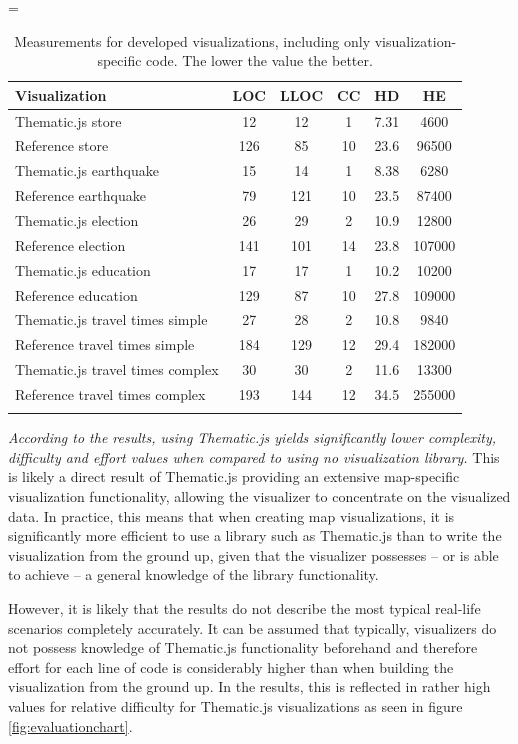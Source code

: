 \LTcapwidth=\textwidth
\begin{longtable}{|l|c|c|c|c|c|}
\hline
\textbf{Visualization} & \textbf{LOC} & \textbf{LLOC} & \textbf{CC} & \textbf{HD} & \textbf{HE} \\
\hline
\rowcolor{gray!15}
Thematic.js store & 12 & 12 & 1 & 7.31 & 4600 \\
\rowcolor{gray!15}
Reference store & 126 & 85 & 10 & 23.6 & 96500 \\
Thematic.js earthquake & 15 & 14 & 1 & 8.38 & 6280 \\
Reference earthquake & 79 & 121 & 10 & 23.5 & 87400 \\
\rowcolor{gray!15}
Thematic.js election & 26 & 29 & 2 & 10.9 & 12800 \\
\rowcolor{gray!15}
Reference election & 141 & 101 & 14 & 23.8 & 107000 \\
Thematic.js education & 17 & 17 & 1 & 10.2 & 10200 \\
Reference education & 129 & 87 & 10 & 27.8 & 109000 \\
\rowcolor{gray!15}
Thematic.js travel times simple & 27 & 28 & 2 & 10.8 & 9840 \\
\rowcolor{gray!15}
Reference travel times simple & 184 & 129 & 12 & 29.4 & 182000 \\
Thematic.js travel times complex & 30 & 30 & 2 & 11.6 & 13300 \\
Reference travel times complex & 193 & 144 & 12 & 34.5 & 255000 \\
\hline
\caption{Measurements for developed visualizations, including only visualization-specific code. The lower the value the better.}
\label{table:efficiencymetrics}
\end{longtable}

\emph{According to the results, using Thematic.js yields significantly lower complexity, difficulty and effort values when compared to using no visualization library.} This is likely a direct result of Thematic.js providing an extensive map-specific visualization functionality, allowing the visualizer to concentrate on the visualized data. In practice, this means that when creating map visualizations, it is significantly more efficient to use a library such as Thematic.js than to write the visualization from the ground up, given that the visualizer possesses -- or is able to achieve -- a general knowledge of the library functionality.

However, it is likely that the results do not describe the most typical real-life scenarios completely accurately. It can be assumed that typically, visualizers do not possess knowledge of Thematic.js functionality beforehand and therefore effort for each line of code is considerably higher than when building the visualization from the ground up. In the results, this is reflected in rather high values for relative difficulty for Thematic.js visualizations as seen in figure \ref{fig:evaluationchart}.


